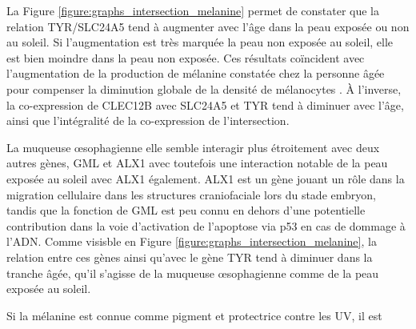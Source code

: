 La Figure \ref{figure:graphs_intersection_melanine} permet de constater que la relation TYR/SLC24A5 tend à augmenter avec l'âge dans la peau exposée ou non au soleil. Si l'augmentation est très marquée la peau non exposée au soleil, elle est bien moindre dans la peau non exposée. Ces résultats coïncident avec l'augmentation de la production de mélanine constatée chez la personne âgée pour compenser la diminution globale de la densité de mélanocytes \cite{Gilchrest1979}. À l'inverse, la co-expression de CLEC12B avec SLC24A5 et TYR tend à diminuer avec l'âge, ainsi que l'intégralité de la co-expression de l'intersection.

La muqueuse œsophagienne elle semble interagir plus étroitement avec deux autres gènes, GML et ALX1 avec toutefois une interaction notable de la peau exposée au soleil avec ALX1 également. ALX1 est un gène jouant un rôle dans la migration cellulaire dans les structures craniofaciale lors du stade embryon, tandis que la fonction de GML est peu connu en dehors d'une potentielle contribution dans la voie d'activation de l'apoptose via p53 en cas de dommage à l'ADN. Comme visisble en Figure \ref{figure:graphs_intersection_melanine}, la relation entre ces gènes ainsi qu'avec le gène TYR tend à diminuer dans la tranche âgée, qu'il s'agisse de la muqueuse œsophagienne comme de la peau exposée au soleil.


Si la mélanine est connue comme pigment et protectrice contre les UV, il est \cite{Tolleson2005}



